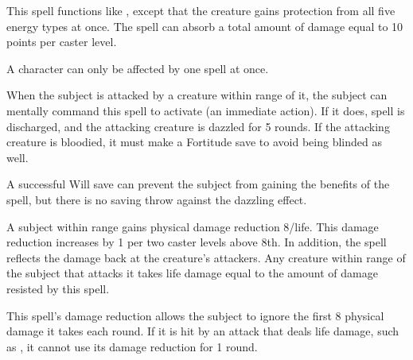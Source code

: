 \begin{spelleffect}
  This spell functions like , except that the creature gains protection from all five energy types at once. The spell can absorb a total amount of damage equal to 10 points per caster level.
\end{spelleffect}
\begin{spellnotes}
  A character can only be affected by one  spell at once.
\end{spellnotes}

\begin{spelleffect}
    When the subject is attacked by a creature within \rngclose range of it, the subject can mentally command this spell to activate (an immediate action). If it does, spell is discharged, and the attacking creature is dazzled for 5 rounds. If the attacking creature is bloodied, it must make a Fortitude save to avoid being blinded as well.
\end{spelleffect}
\begin{spellnotes}
    A successful Will save can prevent the subject from gaining the benefits of the spell, but there is no saving throw against the dazzling effect.
\end{spellnotes}

\spellrng{\rngclose/\rngmed}
\spelldur{\durshort}
\begin{spelleffect}
  A subject within \rngclose range gains physical damage reduction 8/life. This damage reduction increases by 1 per two caster levels above 8th. In addition, the spell reflects the damage back at the creature's attackers. Any creature within \rngmed range of the subject that attacks it takes life damage equal to the amount of damage resisted by this spell.
\end{spelleffect}
\begin{spellnotes}
  This spell's damage reduction allows the subject to ignore the first 8 physical damage it takes each round. If it is hit by an attack that deals life damage, such as , it cannot use its damage reduction for 1 round.
\end{spellnotes}

